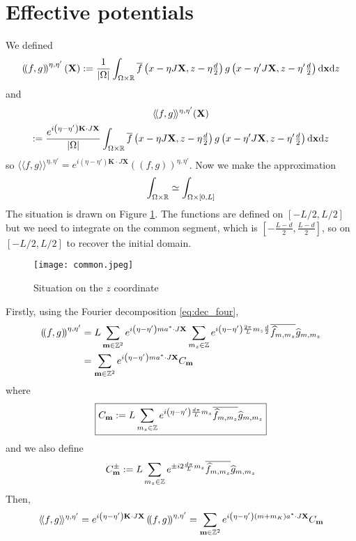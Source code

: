 \documentclass[11pt,a4paper,reqno,french,tikz]{amsart}
\def\d{{\rm d}}
\newcommand{\pa}[1]{\left( #1 \right)} %
\newcommand{\seg}[1]{\left[ #1 \right]} %
\newcommand{\ab}[1]{\left|#1\right|} %
\newcommand{\f}[2]{\frac{#1}{#2}} %
\newcommand{\db}[1]{\left(\!\left( #1 \right)\!\right)}
\def\bX{{\mathbf X}}
\def\bx{{\mathbf x}}
\def\bmm{{\mathbf m}}
\def\bK{{\mathbf K}}
\newcommand{\dd}{\tfrac{d}{2}}
\def\lAngle{\langle\!\langle}
\def\rAngle{\rangle\!\rangle}
\begin{document}
\section{Effective potentials}%
\label{sec:effective_potentials}

We defined
\begin{align*}
\db{ f, g}^{\eta,\eta'}(\bX) :=  \f{1}{\ab{\Omega}} \int_{\Omega \times \R} \overline{f}\pa{x -\eta J\bX,z- \eta\dd} g\pa{x - \eta' J \bX, z- \eta'\dd} \d \bx \d z
\end{align*}
and
\begin{multline*}
\lAngle f, g \rAngle^{\eta,\eta'}(\bX)\\
:=  \f{e^{i\pa{\eta-\eta'} \bK \cdot J \bX}}{\ab{\Omega}} \int_{\Omega \times \R} \overline{f}\pa{x -\eta J\bX,z-\eta \dd} g\pa{x -\eta' J \bX, z-\eta'\dd} \d \bx \d z
\end{multline*}
so $\lAngle f, g \rAngle^{\eta,\eta'} = e^{i\pa{\eta-\eta'} \bK \cdot J \bX}\db{ f, g}^{\eta,\eta'}$. Now we make the approximation
\begin{align*}
\int_{\Omega\times\R} \simeq  \int_{\Omega\times \seg{0,L}}
\end{align*}
The situation is drawn on Figure \ref{fig:z_drawing}. The functions are defined on $[-L/2,L/2]$ but we need to integrate on the common segment, which is $[-\f{L-d}{2},\f{L-d}{2}]$, so on $[-L/2,L/2]$ to recover the initial domain.

\begin{figure}
\begin{center}
\texttt{[image: common.jpeg]}
\label{fig:z_drawing}\caption{Situation on the $z$ coordinate}
\end{center}
\end{figure}


Firstly, using the Fourier decomposition \eqref{eq:dec_four},
\begin{align*}
	\db{f,g}^{\eta,\eta'} &=  L \sum_{\bmm \in \Z^2} e^{i\pa{\eta-\eta'} ma^* \cdot J \bX} \sum_{m_z \in \Z} e^{i\pa{\eta-\eta'} \f{2\pi}{L} m_z \f{d}{2}} \overline{\widehat{f}_{m,m_z}} \widehat{g}_{m,m_z}\\
& = \sum_{\bmm \in \Z^2} e^{i\pa{\eta-\eta'} ma^* \cdot J \bX} C_\bmm
\end{align*}
where
\begin{align*}
\boxed{C_\bmm := L \sum_{m_z \in \Z} e^{i\pa{\eta-\eta'} \f{d\pi}{L} m_z} \overline{\widehat{f}_{m,m_z}} \widehat{g}_{m,m_z}}
\end{align*}
and we also define
\begin{align*}
C^\pm_\bmm := L \sum_{m_z \in \Z} e^{\pm i2 \f{d\pi}{L} m_z} \overline{\widehat{f}_{m,m_z}} \widehat{g}_{m,m_z}
\end{align*}
Then,
\begin{align*}
\lAngle f,g \rAngle ^{\eta,\eta'} = e^{i\pa{\eta-\eta'} \bK \cdot J \bX}\db{f,g}^{\eta,\eta'} =  \sum_{\bmm \in \Z^2} e^{i\pa{\eta-\eta'} \pa{m+m_K}a^* \cdot J \bX} C_\bmm
\end{align*}
\end{document}
